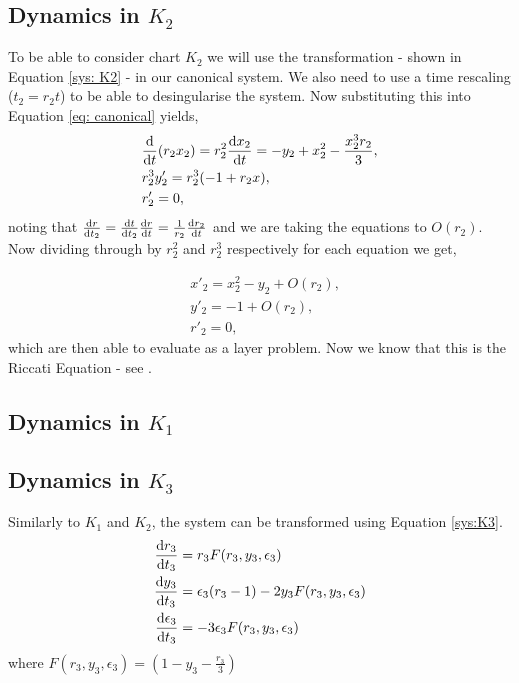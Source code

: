 \subsection{Dynamics in \texorpdfstring{$K_2$}{K2}} \label{sec: VDP K_2}
To be able to consider chart $ K_2 $ %
we will use the transformation - shown in Equation \ref{sys: K2} - in our canonical system. We also need to use a time rescaling ($ t_2=r_2t $) to be able to desingularise the system. Now substituting this into Equation \ref{eq: canonical} yields,
\begin{align}
&\od{}{t}(r_2x_2)=r_2^2\od{x_2}{t}=-y_2+x_2^2-\dfrac{x_2^3r_2}{3},\\
&r^3_2y'_2=r^3_2(-1+r_2x),\\
&r'_2=0,
\end{align}
noting that $ \od{r}{t_2}=\od{t}{t_2}\od{r}{t}=\frac{1}{r_2}\od{r_2}{t} $ and we are taking the equations to $ O(r_2) $. Now dividing through by $ r^2_2 $ and $ r^3_2 $ respectively for each equation we get,

\begin{equation}
	\begin{aligned}
		&x'_2=x^2_2-y_2+O(r_2),\\
		&y'_2=-1+O(r_2),\\
		&r'_2=0,
	\end{aligned}
\end{equation}
which are then able to evaluate as a layer problem. Now we know that this is the Riccati Equation - see \citet{Riccati}.

\subsection{Dynamics in \texorpdfstring{$K_1$}{K1}}

\subsection{Dynamics in \texorpdfstring{$K_3$}{K3}}
Similarly to $K_1$ and $K_2$, the system can be transformed using Equation \ref{sys:K3}.
\begin{align*}
\od{r_3}{t_3}&=r_3F(r_3,y_3,\epsilon_3)\\
\od{y_3}{t_3}&=\epsilon_3(r_3-1)-2y_3F(r_3,y_3,\epsilon_3)\\
\od{\epsilon_3}{t_3}&=-3\epsilon_3F(r_3,y_3,\epsilon_3)
\end{align*}
where $F(r_3,y_3,\epsilon_3)=\left(1-y_3-\frac{r_3}{3}\right)$
\newpage
